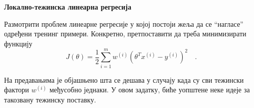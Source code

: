 \item {} {\bf Локално-тежинска линеарна регресија}

Размотрити проблем линеарне регресије у којој постоји жеља да се ``нагласе'' одређени тренинг примери. Конкретно, претпоставити да треба минимизирати функцију
\begin{equation*}
 J(\theta)=\dfrac{1}{2}\sum_{i=1}^m w^{(i)}\left(\theta^Tx^{(i)}-y^{(i)}\right)^2\quad.
\end{equation*}

На предавањима је објашњено шта се дешава у случају када су сви тежински фактори $w^{(i)}$ међусобно једнаки. У овом задатку, биће уопштене неке идеје за такозвану тежинску поставку.

\begin{enumerate}
	
        \ifnum{} {
	  
        }\fi

	
        \ifnum{} {
	  
        }\fi

	
        \ifnum{} {
	  
        }\fi

        
        \ifnum{} {
	  
        }\fi

        
        \ifnum{} {
	  
        }\fi
\end{enumerate}
